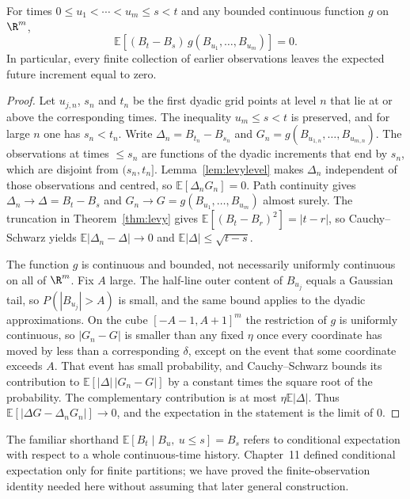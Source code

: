 \begin{proposition}\label{prop:bmmart}
For times $0\le u_1<\cdots<u_m\le s<t$ and any bounded continuous function $g$ on $\R^m$,
\[
 \mathbb E\!\left[(B_t-B_s)\,g(B_{u_1},\ldots,B_{u_m})\right]=0.
\]
In particular, every finite collection of earlier observations leaves the expected future increment equal to zero.
\end{proposition}
\begin{proof}
Let $u_{j,n}$, $s_n$ and $t_n$ be the first dyadic grid points at level $n$ that lie at or above the corresponding times. The inequality $u_m\le s<t$ is preserved, and for large $n$ one has $s_n<t_n$. Write $\Delta_n=B_{t_n}-B_{s_n}$ and $G_n=g(B_{u_{1,n}},\ldots,B_{u_{m,n}})$. The observations at times $\le s_n$ are functions of the dyadic increments that end by $s_n$, which are disjoint from $(s_n,t_n]$. Lemma~\ref{lem:levylevel} makes $\Delta_n$ independent of those observations and centred, so $\mathbb E[\Delta_n G_n]=0$. Path continuity gives $\Delta_n\to\Delta=B_t-B_s$ and $G_n\to G=g(B_{u_1},\ldots,B_{u_m})$ almost surely. The truncation in Theorem~\ref{thm:levy} gives $\mathbb E[(B_t-B_r)^2]=|t-r|$, so Cauchy--Schwarz yields $\mathbb E|\Delta_n-\Delta|\to0$ and $\mathbb E|\Delta|\le\sqrt{t-s}$.

The function $g$ is continuous and bounded, not necessarily uniformly continuous on all of $\R^m$. Fix $A$ large. The half-line outer content of $B_{u_j}$ equals a Gaussian tail, so $P(|B_{u_j}|>A)$ is small, and the same bound applies to the dyadic approximations. On the cube $[-A-1,A+1]^m$ the restriction of $g$ is uniformly continuous, so $|G_n-G|$ is smaller than any fixed $\eta$ once every coordinate has moved by less than a corresponding $\delta$, except on the event that some coordinate exceeds $A$. That event has small probability, and Cauchy--Schwarz bounds its contribution to $\mathbb E[|\Delta|\,|G_n-G|]$ by a constant times the square root of the probability. The complementary contribution is at most $\eta\mathbb E|\Delta|$. Thus $\mathbb E[|\Delta G-\Delta_n G_n|]\to0$, and the expectation in the statement is the limit of $0$.
\end{proof}

The familiar shorthand $\mathbb E[B_t\mid B_u,\ u\le s]=B_s$ refers to conditional expectation with respect to a whole continuous-time history. Chapter~11 defined conditional expectation only for finite partitions; we have proved the finite-observation identity needed here without assuming that later general construction.

